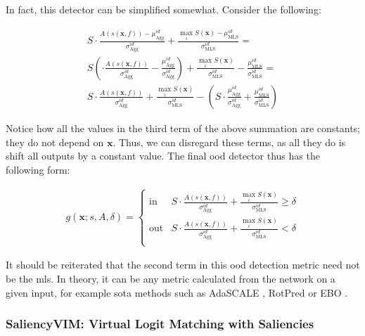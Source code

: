 \documentclass[UKenglish]{uiomasterthesis} %
\theoremstyle{definition}
\begin{document}
In fact, this detector can be simplified somewhat. Consider the following:

\begin{gather}
S \cdot \frac{A(s(\bm{x}, f)) - \mu_{\text{Agg}}^{id}}{\sigma_{\text{Agg}}^{id}} + \frac{\max_i S(\bm{x}) - \mu_{\text{MLS}}^{id}}{\sigma_{\text{MLS}}^{id}} = \\
S \left( \cdot \frac{A(s(\bm{x}, f))}{\sigma_{\text{Agg}}^{id}} - \frac{\mu_{\text{Agg}}^{id}}{\sigma_{\text{Agg}}^{id}} \right) + \frac{\max_i S(\bm{x})}{\sigma_{\text{MLS}}^{id}} - \frac{\mu_{\text{MLS}}^{id}}{\sigma_{\text{MLS}}^{id}} = \\
S \cdot \frac{A(s(\bm{x}, f))}{\sigma_{\text{Agg}}^{id}} + \frac{\max_i S(\bm{x})}{\sigma_{\text{MLS}}^{id}} - \left(S \cdot \frac{\mu_{\text{Agg}}^{id}}{\sigma_{\text{Agg}}^{id}} + \frac{\mu_{\text{MLS}}^{id}}{\sigma_{\text{MLS}}^{id}} \right)
\end{gather}

Notice how all the values in the third term of the above summation are constants; they do not depend on $\bm{x}$. Thus, we can disregard these terms, as all they do is shift all outputs by a constant value. The final \ac{ood} detector thus has the following form:

{\large
\begin{align}
    g(\bm{x}; s, A, \delta)=\begin{cases} 
    \text{in } &  S \cdot \frac{A(s(\bm{x}, f))}{\sigma_{\text{Agg}}^{id}} + \frac{\max_i S(\bm{x})}{\sigma_{\text{MLS}}^{id}} \ge \delta \\[10pt]
    \text{out} &  S \cdot \frac{A(s(\bm{x}, f))}{\sigma_{\text{Agg}}^{id}} + \frac{\max_i S(\bm{x})}{\sigma_{\text{MLS}}^{id}} < \delta \\[10pt]
   \end{cases}
\label{eq:aggregate}
\end{align}
}

It should be reiterated that the second term in this \ac{ood} detection metric need not be the \ac{mls}. In theory, it can be any metric calculated from the network on a given input, for example \ac{sota} methods such as AdaSCALE \cite{adascale}, RotPred \cite{rotpred} or EBO \cite{energy}.

\subsubsection{SaliencyVIM: Virtual Logit Matching with Saliencies} \label{section:saliencyvim_method}
\end{document}
